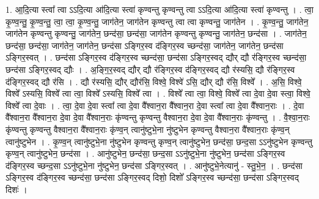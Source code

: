 \documentclass[17pt]{extarticle}
\begin{document}
1. आ॒दि॒त्या स्त्वा᳚ त्वा ऽऽदि॒त्या आ॑दि॒त्या स्त्वा॑ कृण्वन्तु कृण्वन्तु त्वा ऽऽदि॒त्या आ॑दि॒त्या स्त्वा॑ कृण्वन्तु । . त्वा॒ कृ॒ण्व॒न्तु॒ कृ॒ण्व॒न्तु॒ त्वा॒ त्वा॒ कृ॒ण्व॒न्तु॒ जाग॑तेन॒ जाग॑तेन कृण्वन्तु त्वा त्वा कृण्वन्तु॒ जाग॑तेन । . कृ॒ण्व॒न्तु॒ जाग॑तेन॒ जाग॑तेन कृण्वन्तु कृण्वन्तु॒ जाग॑तेन॒ छन्द॑सा॒ छन्द॑सा॒ जाग॑तेन कृण्वन्तु कृण्वन्तु॒ जाग॑तेन॒ छन्द॑सा । . जाग॑तेन॒ छन्द॑सा॒ छन्द॑सा॒ जाग॑तेन॒ जाग॑तेन॒ छन्द॑सा ऽङ्गिर॒स्व द॑ङ्गिर॒स्व च्छन्द॑सा॒ जाग॑तेन॒ जाग॑तेन॒ छन्द॑सा ऽङ्गिर॒स्वत् । . छन्द॑सा ऽङ्गिर॒स्व द॑ङ्गिर॒स्व च्छन्द॑सा॒ छन्द॑सा ऽङ्गिर॒स्वद् द्यौर् द्यौ र॑ङ्गिर॒स्व च्छन्द॑सा॒ छन्द॑सा ऽङ्गिर॒स्वद् द्यौः । . अ॒ङ्गि॒र॒स्वद् द्यौर् द्यौ र॑ङ्गिर॒स्व द॑ङ्गिर॒स्वद् द्यौ र॑स्यसि॒ द्यौ र॑ङ्गिर॒स्व द॑ङ्गिर॒स्वद् द्यौ र॑सि । . द्यौ र॑स्यसि॒ द्यौर् द्यौर॑सि॒ विश्वे॒ विश्वे॑ ऽसि॒ द्यौर् द्यौ र॑सि॒ विश्वे᳚ । . अ॒सि॒ विश्वे॒ विश्वे᳚ ऽस्यसि॒ विश्वे᳚ त्वा त्वा॒ विश्वे᳚ ऽस्यसि॒ विश्वे᳚ त्वा । . विश्वे᳚ त्वा त्वा॒ विश्वे॒ विश्वे᳚ त्वा दे॒वा दे॒वा स्त्वा॒ विश्वे॒ विश्वे᳚ त्वा दे॒वाः । . त्वा॒ दे॒वा दे॒वा स्त्वा᳚ त्वा दे॒वा वै᳚श्वान॒रा वै᳚श्वान॒रा दे॒वा स्त्वा᳚ त्वा दे॒वा वै᳚श्वान॒राः । . दे॒वा वै᳚श्वान॒रा वै᳚श्वान॒रा दे॒वा दे॒वा वै᳚श्वान॒राः कृ॑ण्वन्तु कृण्वन्तु वैश्वान॒रा दे॒वा दे॒वा वै᳚श्वान॒राः कृ॑ण्वन्तु । . वै॒श्वा॒न॒राः कृ॑ण्वन्तु कृण्वन्तु वैश्वान॒रा वै᳚श्वान॒राः कृ॑ण्व॒न् त्वानु॑ष्टुभे॒ना नु॑ष्टुभेन कृण्वन्तु वैश्वान॒रा वै᳚श्वान॒राः कृ॑ण्व॒न् त्वानु॑ष्टुभेन । . कृ॒ण्व॒न् त्वानु॑ष्टुभे॒ना नु॑ष्टुभेन कृण्वन्तु कृण्व॒न् त्वानु॑ष्टुभेन॒ छन्द॑सा॒ छन्द॒सा ऽऽनु॑ष्टुभेन कृण्वन्तु कृण्व॒न् त्वानु॑ष्टुभेन॒ छन्द॑सा । . आनु॑ष्टुभेन॒ छन्द॑सा॒ छन्द॒सा ऽऽनु॑ष्टुभे॒ना नु॑ष्टुभेन॒ छन्द॑सा ऽङ्गिर॒स्व द॑ङ्गिर॒स्व च्छन्द॒सा ऽऽनु॑ष्टुभे॒ना नु॑ष्टुभेन॒ छन्द॑सा ऽङ्गिर॒स्वत् । . आनु॑ष्टुभे॒नेत्यानु॑ - स्तु॒भे॒न॒ । . छन्द॑सा ऽङ्गिर॒स्व द॑ङ्गिर॒स्व च्छन्द॑सा॒ छन्द॑सा ऽङ्गिर॒स्वद् दिशो॒ दिशो᳚ ऽङ्गिर॒स्व च्छन्द॑सा॒ छन्द॑सा ऽङ्गिर॒स्वद् दिशः॑ । \newline
\end{document}
